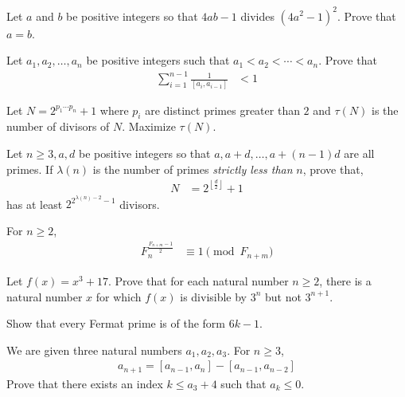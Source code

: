 \documentclass[problems.tex]{subfile}
\begin{document}
	\begin{problem}
		Let $a$ and $b$ be positive integers so that $4ab-1$ divides $(4a^2-1)^2$. Prove that $a=b$.
	\end{problem}

	\begin{problem}\label{prob:mirzakhani9}
		Let $a_1,a_2,\ldots,a_n$ be positive integers such that $a_1<a_2<\cdots < a_n$. Prove that
		\begin{align*}
			\sum_{i=1}^{n-1} \frac{1}{[a_i,a_{i-1}]} & <1
		\end{align*}
	\end{problem}

	\begin{problem}
		Let $N=2^{p_1\cdots p_n}+1$ where $p_i$ are distinct primes greater than $2$ and $\tau(N)$ is the number of divisors of $N$. Maximize $\tau(N)$.
	\end{problem}

	\begin{problem}
		Let $n\geq3,a,d$ be positive integers so that $a,a+d,\ldots,a+(n-1)d$ are all primes. If $\lambda(n)$ is the number of primes \textit{strictly less than }$n$, prove that,
			\begin{align*}
				N & = 2^{\left\lfloor\frac{d}{2}\right\rfloor}+1
			\end{align*}
		has at least $2^{2^{\lambda(n)-2}-1}$ divisors.
	\end{problem}

	\begin{problem}
		For $n\geq2$,
		\begin{align*}
			F_n^{\frac{F_{n+m}-1}{2}} &\equiv1\pmod{F_{n+m}}
		\end{align*}
	\end{problem}

	\begin{problem}
		Let $f(x) = x^3 + 17$. Prove that for each natural number $n\geq 2$, there is a natural number $x$ for which $f(x)$ is divisible by $3^n$ but not $3^{n+1}$.
	\end{problem}

	\begin{problem}[Boylai]
		Show that every Fermat prime is of the form $6k-1$.
	\end{problem}

	\begin{problem}
		We are given three natural numbers $a_1,a_2,a_3$. For $n\geq3$,
			\begin{align*}
				a_{n+1} = [a_{n-1},a_n]-[a_{n-1},a_{n-2}]
			\end{align*}
		Prove that there exists an index $k\leq a_3+4$ such that $a_k\leq0$.
	\end{problem}
\end{document}
